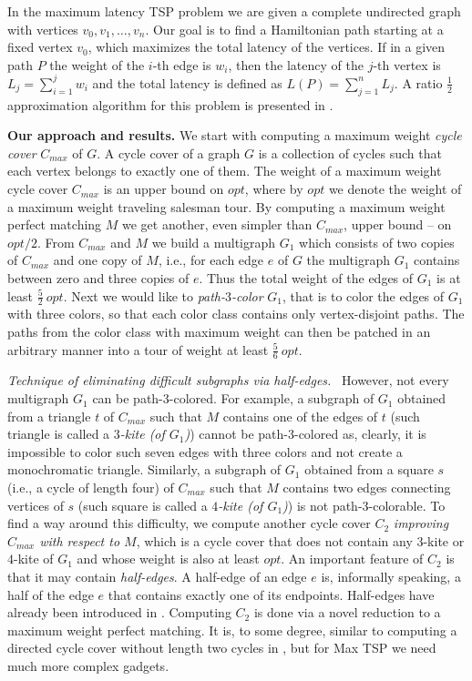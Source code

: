 \documentclass[a4, 11pt]{article}
\newcommand{\<}{\langle}
\renewcommand{\>}{\rangle}
\begin{document}
In the maximum latency TSP problem  we are given a complete undirected graph with vertices $v_0, v_1, \ldots, v_n$. Our goal is to find a Hamiltonian path starting at a fixed vertex $v_0$, which maximizes the total latency of the vertices. If in a given path $P$ the weight of the $i$-th edge is $w_i$, then the latency of the $j$-th vertex is $L_j = \sum_{i = 1}^j w_i$ and the total latency is defined as $L(P) = \sum_{j = 1}^n L_j$. A ratio $\frac{1}{2}$  approximation algorithm for this problem is presented in \cite{motwani}.

{\bf Our approach and results.} We start with computing a maximum weight {\em cycle cover} $C_{max}$  of $G$. A cycle cover of a graph $G$ is  a collection of cycles such  that each vertex belongs to exactly one of them. The weight of a maximum weight cycle cover $C_{max}$ is an upper bound on $opt$, where by $opt$ we denote the weight of a maximum weight traveling salesman tour.  By computing a maximum weight perfect matching $M$ we get another, even simpler than $C_{max}$,  upper bound -- on $opt/2$. From $C_{max}$ and $M$ we build a multigraph $G_1$ which consists of two copies of $C_{max}$ and one copy of $M$, i.e.,  for each edge $e$ of $G$  the multigraph $G_1$ contains between zero and three copies of $e$. Thus the total weight of the edges of $G_1$ is at least $\frac 52 \ opt$.  Next we would like to  {\em path-$3$-color} $G_1$, that is  to color the edges of $G_1$ with three colors, so that each color class
contains only vertex-disjoint paths. The paths from  the color class with maximum weight can then be patched in an arbitrary manner  into a tour of weight at least $\frac 56 \ opt$.



{\em Technique of eliminating difficult subgraphs via half-edges.} \  However, not every multigraph $G_1$ can be path-3-colored. For example, a subgraph of $G_1$ obtained  from a triangle $t$   of $C_{max}$  such that $M$  contains one of the edges of $t$ (such triangle is called a {\em $3$-kite (of $G_1$)}) cannot be path-3-colored as, clearly,  it is impossible to color such seven edges  with three colors and not create a monochromatic triangle.
Similarly, a subgraph of $G_1$ obtained from a square $s$  (i.e., a cycle of length four) of $C_{max}$  such that $M$  contains two edges connecting vertices of $s$  (such square is called a {\em $4$-kite (of $G_1$)}) is not path-3-colorable. To find a way around this difficulty, we compute another cycle cover $C_2$ {\em
improving $C_{max}$ with respect to $M$}, which is a cycle cover that does not contain any $3$-kite or $4$-kite of $G_1$ and whose weight is also at least $opt$.  An important feature of $C_2$ is that it may contain
{\em half-edges}. A half-edge of an edge $e$ is, informally speaking, a half of the edge $e$ that contains exactly one of its endpoints. Half-edges have already been introduced in \cite{PEZ}. Computing $C_2$ is done via a novel reduction to a maximum weight perfect matching. It is, to some degree, similar to computing a directed cycle cover without  length two cycles in \cite{PEZ}, but for Max TSP we need much more complex gadgets. 
\end{document}
